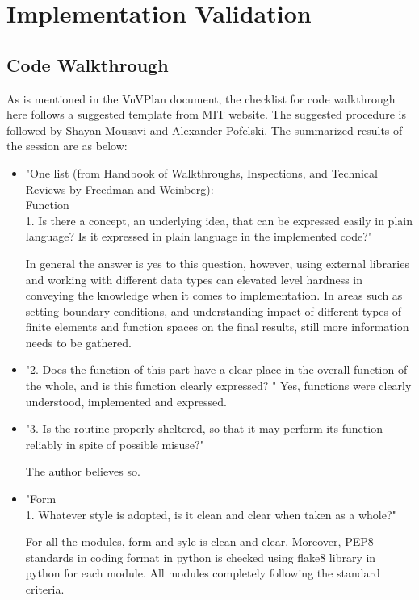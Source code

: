 \documentclass[12pt, titlepage]{article}
\begin{document}
\section{Implementation Validation}
\subsection{Code Walkthrough}

As is mentioned in the VnVPlan document, the checklist for code walkthrough here follows a suggested \href{http://www.mit.edu/~mbarker/ideas/review.txt}{template from MIT website}. The suggested procedure is followed by Shayan Mousavi and Alexander Pofelski. The summarized results of the session are as below:

\begin{itemize}
	\item "One list (from Handbook of Walkthroughs, Inspections, and Technical
	Reviews by Freedman and Weinberg):\\
	Function\\
	1.  Is there a concept, an underlying idea, that can be expressed
	easily in plain language?  Is it expressed in plain language in the
	implemented code?"
	
	\subitem  In general the answer is yes to this question, however, using external libraries and working with different data types can elevated level hardness in conveying the knowledge when it comes to implementation. In areas such as setting boundary conditions, and understanding impact of different types of finite elements and function spaces on the final results, still more information needs to be gathered.
	
	\item "2.  Does the function of this part have a clear place in the overall
	function of the whole, and is this function clearly expressed?
	"
	\subitem Yes, functions were clearly understood, implemented and expressed.
	
	\item"3.  Is the routine properly sheltered, so that it may perform its
	function reliably in spite of possible misuse?"
	
	\subitem The author believes so.
	
	\item "Form\\ 1.  Whatever style is adopted, is it clean and clear when taken as a
	whole?"
	
	\subitem For all the modules, form and syle is clean and clear. Moreover, PEP8 standards in coding format in python is checked using flake8 library in python for each module. All modules completely following the standard criteria.  
	

\end{itemize}
\end{document}
